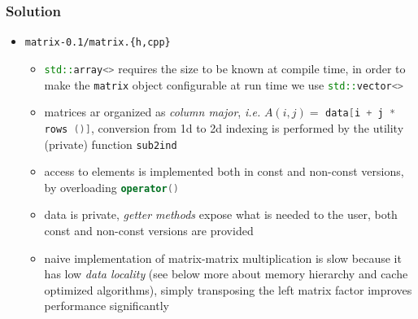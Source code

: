 \documentclass[smaller,a4paper,allowframebreaks]{beamer}
\begin{document}
\begin{frame}[allowframebreaks]\frametitle{Solution}
\begin{itemize}
\item {\tt matrix-0.1/matrix.\{h,cpp\}}\\[3mm]
\begin{itemize}
\item \lstinline[language=C++]{std::array<>}
      requires the size to be known at compile time,
      in order to make the \lstinline[language=C++]{matrix}
      object configurable at run time we use 
      \lstinline[language=C++]{std::vector<>}\\[3mm]
\item matrices ar organized as \emph{column major}, {\it i.e.}
      $A(i, j) = $ \lstinline[language=C++]{data[i + j * rows ()]}, 
      conversion from 1d to 2d indexing is performed by the utility
      (private) function \lstinline[language=C++]{sub2ind}\\[3mm]
\item access to elements is implemented both in const and non-const
      versions, by overloading \lstinline[language=C++]{operator()} \\[3mm]
\item data is private, \emph{getter methods} expose what is needed to 
      the user, both const and non-const versions are provided \\[3mm]
\item naive implementation of matrix-matrix multiplication is slow 
      because it has low \emph{data locality}
      (see below more about memory hierarchy and cache optimized algorithms), 
      simply transposing the left matrix factor improves performance significantly\\[3mm]

\end{itemize}
\end{itemize}
\end{frame}
\end{document}
